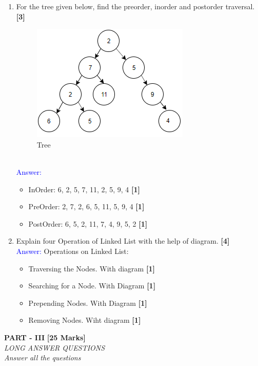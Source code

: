 \documentclass[12pt ,a4paper]{exam}
\begin{document}
\begin{enumerate}[start=1,label={\bfseries Q\arabic*)}]
\begin{itemize}
		\end{itemize}
	    \pagebreak
		\item For the tree given below, find the preorder, inorder and postorder traversal. \hfill \textbf{[3]}
		\begin{figure}[h]
			\centering
			\includegraphics[width=0.7\linewidth]{"Screenshot 2020-12-26 at 9.29.16 AM"}
			\caption{Tree}
			\label{fig:screenshot-2020-12-26-at-9}
		\end{figure}\\
		\textcolor{blue}{Answer: } 
		\begin{itemize}
			\item InOrder: 6, 2, 5, 7, 11, 2, 5, 9, 4 \hfill \textbf{[1]}
			\item PreOrder: 2, 7, 2, 6, 5, 11, 5, 9, 4 \hfill \textbf{[1]}
			\item PostOrder: 6, 5, 2, 11, 7, 4, 9, 5, 2 \hfill \textbf{[1]}
		\end{itemize}
	   \item Explain four Operation of Linked List with the help of diagram. \hfill \textbf{[4]}\\
	   \textcolor{blue}{Answer: } Operations on Linked List:
	   \begin{itemize}
	   	\item Traversing the Nodes. With diagram \hfill \textbf{[1]}
	   	\item Searching for a Node. With Diagram \hfill \textbf{[1]}
	   	\item Prepending Nodes. With Diagram \hfill \textbf{[1]}
	   	\item Removing Nodes. Wiht diagram  \hfill \textbf{[1]}
	   \end{itemize}
	\end{enumerate}
	\pagebreak
	\begin{center}
		\textbf{PART - III} \textbf{[25 Marks]}\\
		\noindent \textit{LONG ANSWER QUESTIONS} \\
		\noindent \textit{Answer all the questions}  
	\end{center}
	
\end{document}
